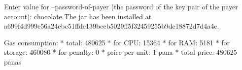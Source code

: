 \begin{shellbox}\begin{ttlst}
Enter value for --password-of-payer (the password of the key pair of the payer account): chocolate
The jar has been installed at a699f4d999c56a24ebc51ffde139beeb5029ff5f32459255b9dc18872d7d4a4c.

Gas consumption:
 * total: 480625
   * for CPU: 15364
   * for RAM: 5181
   * for storage: 460080
   * for penalty: 0
 * price per unit: 1 pana
 * total price: 480625 panas
\end{ttlst}\end{shellbox}
